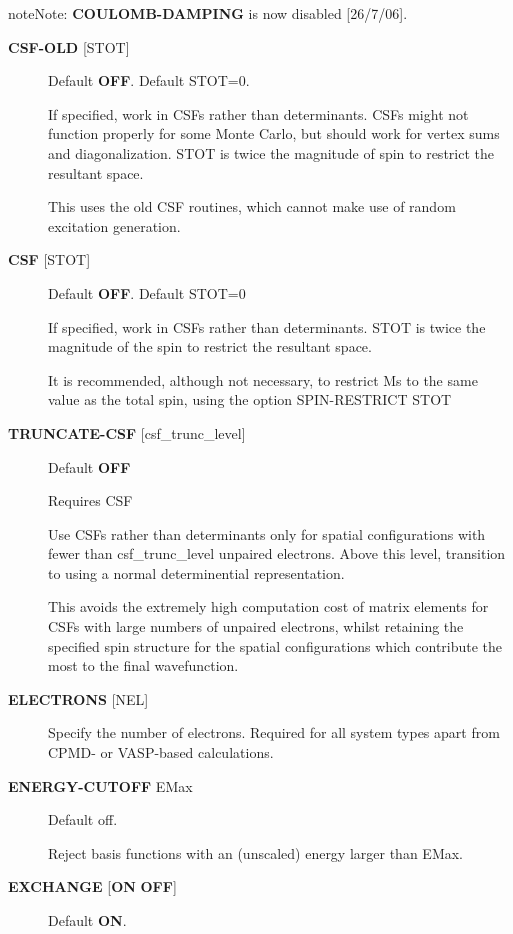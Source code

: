 \documentclass[openany,a4paper,10pt,english]{manual}
\begin{document}
\begin{notice}{note}{Note:}
\textbf{COULOMB-DAMPING} is now disabled {[}26/7/06{]}.
\end{notice}
\begin{description}
\item[\textbf{CSF-OLD} {[}STOT{]}] \leavevmode
Default \textbf{OFF}.  Default STOT=0.

If specified, work in CSFs rather than determinants.  CSFs might not
function properly for some Monte Carlo, but should work for vertex
sums and diagonalization.   STOT is twice the magnitude of spin to
restrict the resultant space.

This uses the old CSF routines, which cannot make use of random
excitation generation.

\item[\textbf{CSF} {[}STOT{]}] \leavevmode
Default \textbf{OFF}.  Default STOT=0

If specified, work in CSFs rather than determinants. STOT is twice
the magnitude of the spin to restrict the resultant space.

It is recommended, although not necessary, to restrict Ms to the
same value as the total spin, using the option SPIN-RESTRICT STOT

\item[\textbf{TRUNCATE-CSF} {[}csf\_trunc\_level{]}] \leavevmode
Default \textbf{OFF}

Requires CSF

Use CSFs rather than determinants only for spatial configurations with
fewer than csf\_trunc\_level unpaired electrons. Above this level,
transition to using a normal determinential representation.

This avoids the extremely high computation cost of matrix elements for
CSFs with large numbers of unpaired electrons, whilst retaining the
specified spin structure for the spatial configurations which contribute
the most to the final wavefunction.

\item[\textbf{ELECTRONS} {[}NEL{]}] \leavevmode
Specify the number of electrons.  Required for all system types
apart from CPMD- or VASP-based  calculations.

\item[\textbf{ENERGY-CUTOFF} EMax] \leavevmode
Default off.

Reject basis functions with an (unscaled) energy larger than EMax.

\item[\textbf{EXCHANGE} {[}\textbf{ON} \textbar{} \textbf{OFF}{]}] \leavevmode
Default \textbf{ON}.


\end{description}
\end{document}
